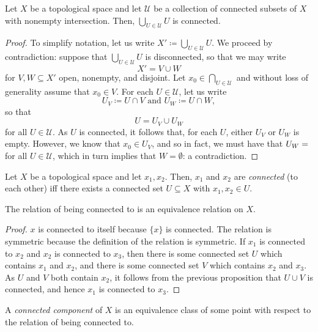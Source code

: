 \begin{prp}
Let $X$ be a topological space and let $\mathcal{U}$ be a collection of connected subsets of $X$ with nonempty intersection.  Then, $\bigcup _{U\in \mathcal{U}}U$ is connected.
\begin{proof}
To simplify notation, let us write $X'\coloneqq \bigcup _{U\in \mathcal{U}}U$.  We proceed by contradiction:  suppose that $\bigcup _{U\in \mathcal{U}}U$ is disconnected, so that we may write
\begin{equation}
X'=V\cup W
\end{equation}
for $V,W\subseteq X'$ open, nonempty, and disjoint.  Let $x_0\in \bigcap _{U\in \mathcal{U}}$ and without loss of generality assume that $x_0\in V$.  For each $U\in \mathcal{U}$, let us write
\begin{equation}
U_V\coloneqq U\cap V\text{ and }U_W\coloneqq U\cap W,
\end{equation}
so that
\begin{equation}
U=U_V\cup U_W
\end{equation}
for all $U\in \mathcal{U}$.  As $U$ is connected, it follows that, for each $U$, either $U_V$ or $U_W$ is empty.  However, we know that $x_0\in U_V$, and so in fact, we must have that $U_W=\empty$ for all $U\in \mathcal{U}$, which in turn implies that $W=\emptyset$:  a contradiction.
\end{proof}
\end{prp}
\begin{dfn}
Let $X$ be a topological space and let $x_1,x_2$.  Then, $x_1$ and $x_2$ are \emph{connected} (to each other) iff there exists a connected set $U\subseteq X$ with $x_1,x_2\in U$.
\begin{prp}
The relation of being connected to is an equivalence relation on $X$.
\begin{proof}
$x$ is connected to itself because $\{ x\}$ is connected.  The relation is symmetric because the definition of the relation is symmetric.  If $x_1$ is connected to $x_2$ and $x_2$ is connected to $x_3$, then there is some connected set $U$ which contains $x_1$ and $x_2$, and there is some connected set $V$ which contains $x_2$ and $x_3$.  As $U$ and $V$ both contain $x_2$, it follows from the previous proposition that $U\cup V$ is connected, and hence $x_1$ is connected to $x_3$.
\end{proof}
\end{prp}
A \emph{connected component} of $X$ is an equivalence class of some point with respect to the relation of being connected to.
\end{dfn}

